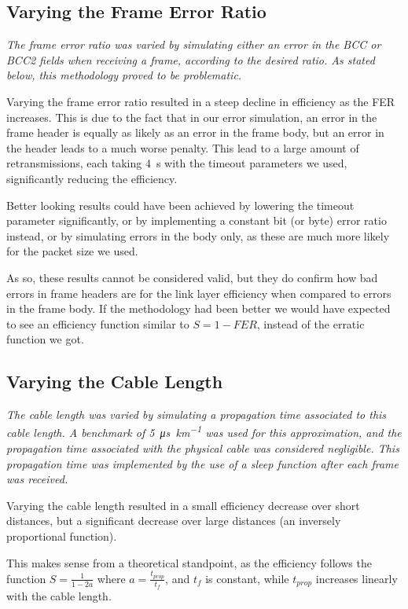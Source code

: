 \documentclass[11pt,a4paper,twocolumn]{article}
\begin{document}
\subsection{Varying the Frame Error Ratio}

\textit{The frame error ratio was varied by simulating either an error in the BCC or BCC2 fields when receiving a frame, according to the desired ratio. As stated below, this methodology proved to be problematic.}

Varying the frame error ratio resulted in a steep decline in efficiency as the FER increases.
This is due to the fact that in our error simulation, an error in the frame header is equally as likely as an error in the frame body, but an error in the header leads to a much worse penalty.
This lead to a large amount of retransmissions, each taking \qty{4}{\second} with the timeout parameters we used, significantly reducing the efficiency.

Better looking results could have been achieved by lowering the timeout parameter significantly, or by implementing a constant bit (or byte) error ratio instead, or by simulating errors in the body only, as these are much more likely for the packet size we used.

As so, these results cannot be considered valid, but they do confirm how bad errors in frame headers are for the link layer efficiency when compared to errors in the frame body.
If the methodology had been better we would have expected to see an efficiency function similar to $S = 1 - FER$, instead of the erratic function we got.

\subsection{Varying the Cable Length}

\textit{The cable length was varied by simulating a propagation time associated to this cable length. A benchmark of \qty[per-mode=symbol]{5}{\micro\second\per\kilo\metre} was used for this approximation, and the propagation time associated with the physical cable was considered negligible. This propagation time was implemented by the use of a sleep function after each frame was received.}

Varying the cable length resulted in a small efficiency decrease over short distances, but a significant decrease over large distances (an inversely proportional function).

This makes sense from a theoretical standpoint, as the efficiency follows the function $S = \frac{1}{1 - 2a}$ where $a = \frac{t_{prop}}{t_f}$, and $t_f$ is constant, while $t_{prop}$ increases linearly with the cable length.
\end{document}
